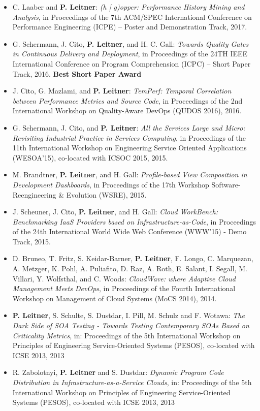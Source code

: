 \documentclass[paper=letter,fontsize=11pt]{scrartcl} %
\begin{document}
\begin{itemize}
	\item C. Laaber and \textbf{P. Leitner}: \emph{ (h | g)opper: Performance History Mining and Analysis},  in Proceedings of the 7th ACM/SPEC International Conference on Performance Engineering (ICPE) -- Poster and Demonstration Track, 2017.
	\item G. Schermann, J. Cito, \textbf{P. Leitner}, and H. C. Gall: \emph{Towards Quality Gates in Continuous Delivery and Deployment}, in Proceedings of the 24TH IEEE International Conference on Program Comprehension (ICPC) – Short Paper Track, 2016. \textbf{Best Short Paper Award}
	\item J. Cito, G. Mazlami, and \textbf{P. Leitner}: \emph{TemPerf: Temporal Correlation between Performance Metrics and Source Code}, in Proceedings of the 2nd International Workshop on Quality-Aware DevOps (QUDOS 2016), 2016.
    \item G. Schermann, J. Cito, and \textbf{P. Leitner}: \emph{All the Services Large and Micro: Revisiting Industrial Practice in Services Computing}, in Proceedings of the 11th International Workshop on Engineering Service Oriented Applications (WESOA’15), co-located with ICSOC 2015, 2015.
    \item M. Brandtner, \textbf{P. Leitner}, and H. Gall: \emph{Profile-based View Composition in Development Dashboards}, in Proceedings of the 17th Workshop Software-Reengineering \& Evolution (WSRE), 2015.
  \item J. Scheuner, J. Cito, \textbf{P. Leitner}, and H. Gall: \emph{Cloud WorkBench: Benchmarking IaaS Providers based on Infrastructure-as-Code}, in Proceedings of the 24th International World Wide Web Conference (WWW'15) - Demo Track, 2015.
 \item D. Bruneo, T. Fritz, S. Keidar-Barner, \textbf{P. Leitner}, F. Longo, C. Marquezan, A. Metzger, K. Pohl, A. Puliafito, D. Raz, A. Roth, E. Salant, I. Segall, M. Villari, Y. Wolfsthal, and C. Woods: \emph{CloudWave: where Adaptive Cloud Management Meets DevOps}, in Proceedings of the Fourth International Workshop on Management of Cloud Systems (MoCS 2014), 2014.
 \item \textbf{P. Leitner}, S. Schulte, S. Dustdar, I. Pill, M. Schulz and F. Wotawa: \emph{The Dark Side of SOA Testing - Towards Testing Contemporary SOAs Based on Criticality Metrics}, in: Proceedings of the 5th International Workshop on Principles of Engineering Service-Oriented Systems (PESOS), co-located with ICSE 2013, 2013
\item R. Zabolotnyi, \textbf{P. Leitner} and S. Dustdar: \emph{Dynamic Program Code Distribution in Infrastructure-as-a-Service Clouds}, in: Proceedings of the 5th International Workshop on Principles of Engineering Service-Oriented Systems (PESOS), co-located with ICSE 2013, 2013

\end{itemize}
\end{document}
